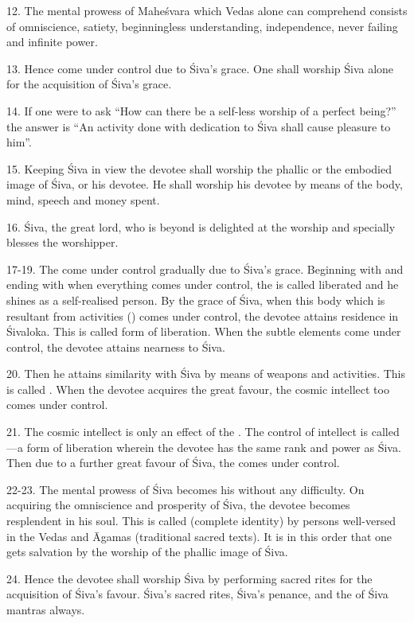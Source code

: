 12. The mental prowess of Maheśvara which Vedas alone can comprehend consists of
omniscience, satiety, beginningless understanding, independence, never failing
and infinite power.

13. Hence  \etc come under control due to Śiva’s grace. One shall
worship Śiva alone for the acquisition of Śiva’s grace.

14. If one were to ask “How can there be a self-less worship of a perfect
being?” the answer is “An activity done with dedication to Śiva shall cause
pleasure to him”.

15. Keeping Śiva in view the devotee shall worship the phallic or the embodied
image of Śiva, or his devotee. He shall worship his devotee by means of the body,
mind, speech and money spent.

16. Śiva, the great lord, who is beyond  is delighted at the worship
and specially blesses the worshipper.

17-19. The  \etc come under control gradually due to Śiva’s grace.
Beginning with  and ending with  when everything comes
under control, the  is called liberated and he shines as
a self-realised person. By the grace of Śiva, when this body which is resultant
from activities () comes under control, the devotee attains
residence in Śivaloka. This is called  form of liberation. When
the subtle elements come under control, the devotee attains nearness to Śiva.

20. Then he attains similarity with Śiva by means of weapons and activities.
This is called . When the devotee acquires the great favour,
the cosmic intellect too comes under control.

21. The cosmic intellect is only an effect of the . The control of
intellect is called —a form of liberation wherein the devotee has
the same rank and power as Śiva. Then due to a further great favour of Śiva,
the  comes under control.

22-23. The mental prowess of Śiva becomes his without any difficulty. On
acquiring the omniscience and prosperity of Śiva, the devotee becomes
resplendent in his soul. This is called  (complete identity) by
persons well-versed in the Vedas and Āgamas (traditional sacred texts). It is in
this order that one gets salvation by the worship of the phallic image of Śiva.

24. Hence the devotee shall worship Śiva by performing sacred rites \etc for
the acquisition of Śiva’s favour. Śiva’s sacred rites, Śiva’s penance, and
the  of Śiva mantras always.

